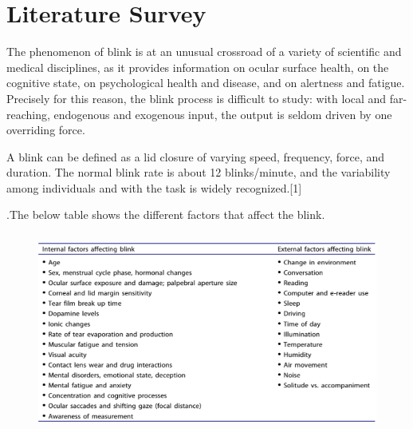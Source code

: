 \section*{Literature Survey}
The phenomenon of blink is at an unusual crossroad of a variety of scientific and medical disciplines, as it provides information on ocular surface health, on the cognitive state, on psychological health and disease, and on alertness and fatigue. Precisely for this reason, the blink process is difficult to study: with local and far-reaching, endogenous and exogenous input, the output is seldom driven by one overriding force.

	A blink can be defined as a lid closure of varying speed, frequency, force, and duration. The normal blink rate is about 12 blinks/minute, and the variability among individuals and with the task is widely recognized.\cite{9302890}[1]

.The below table shows the different factors that affect the blink.
\begin{figure}[h]
    \centering
    \includegraphics[height=6.5cm]{images/factors.png}
\end{figure}	
	
